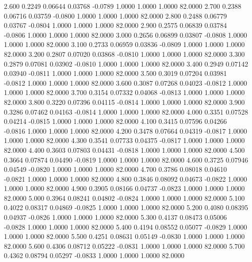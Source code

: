    2.600   0.2249   0.06644   0.03768  -0.0789   1.0000   1.0000   1.0000  82.0000
   2.700   0.2388   0.06716   0.03759  -0.0800   1.0000   1.0000   1.0000  82.0000
   2.800   0.2488   0.06779   0.03767  -0.0804   1.0000   1.0000   1.0000  82.0000
   2.900   0.2575   0.06839   0.03784  -0.0806   1.0000   1.0000   1.0000  82.0000
   3.000   0.2656   0.06899   0.03807  -0.0808   1.0000   1.0000   1.0000  82.0000
   3.100   0.2733   0.06959   0.03836  -0.0809   1.0000   1.0000   1.0000  82.0000
   3.200   0.2807   0.07020   0.03868  -0.0810   1.0000   1.0000   1.0000  82.0000
   3.300   0.2879   0.07081   0.03902  -0.0810   1.0000   1.0000   1.0000  82.0000
   3.400   0.2949   0.07142   0.03940  -0.0811   1.0000   1.0000   1.0000  82.0000
   3.500   0.3019   0.07204   0.03981  -0.0812   1.0000   1.0000   1.0000  82.0000
   3.600   0.3087   0.07268   0.04023  -0.0812   1.0000   1.0000   1.0000  82.0000
   3.700   0.3154   0.07332   0.04068  -0.0813   1.0000   1.0000   1.0000  82.0000
   3.800   0.3220   0.07396   0.04115  -0.0814   1.0000   1.0000   1.0000  82.0000
   3.900   0.3286   0.07462   0.04163  -0.0814   1.0000   1.0000   1.0000  82.0000
   4.000   0.3351   0.07528   0.04214  -0.0815   1.0000   1.0000   1.0000  82.0000
   4.100   0.3415   0.07596   0.04266  -0.0816   1.0000   1.0000   1.0000  82.0000
   4.200   0.3478   0.07664   0.04319  -0.0817   1.0000   1.0000   1.0000  82.0000
   4.300   0.3541   0.07733   0.04375  -0.0817   1.0000   1.0000   1.0000  82.0000
   4.400   0.3603   0.07803   0.04431  -0.0818   1.0000   1.0000   1.0000  82.0000
   4.500   0.3664   0.07874   0.04490  -0.0819   1.0000   1.0000   1.0000  82.0000
   4.600   0.3725   0.07946   0.04549  -0.0820   1.0000   1.0000   1.0000  82.0000
   4.700   0.3786   0.08018   0.04610  -0.0821   1.0000   1.0000   1.0000  82.0000
   4.800   0.3846   0.08092   0.04673  -0.0822   1.0000   1.0000   1.0000  82.0000
   4.900   0.3905   0.08166   0.04737  -0.0823   1.0000   1.0000   1.0000  82.0000
   5.000   0.3964   0.08241   0.04802  -0.0824   1.0000   1.0000   1.0000  82.0000
   5.100   0.4022   0.08317   0.04869  -0.0825   1.0000   1.0000   1.0000  82.0000
   5.200   0.4080   0.08395   0.04937  -0.0826   1.0000   1.0000   1.0000  82.0000
   5.300   0.4137   0.08473   0.05006  -0.0828   1.0000   1.0000   1.0000  82.0000
   5.400   0.4194   0.08552   0.05077  -0.0829   1.0000   1.0000   1.0000  82.0000
   5.500   0.4251   0.08631   0.05149  -0.0830   1.0000   1.0000   1.0000  82.0000
   5.600   0.4306   0.08712   0.05222  -0.0831   1.0000   1.0000   1.0000  82.0000
   5.700   0.4362   0.08794   0.05297  -0.0833   1.0000   1.0000   1.0000  82.0000
